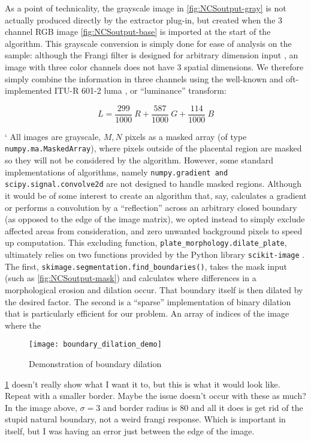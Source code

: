	As a point of technicality, the grayscale image in \cref{fig:NCSoutput-gray} is not actually produced directly by the extractor plug-in, but created when the 3 channel RGB image \cref{fig:NCSoutput-base} is imported at the start of the algorithm. This grayscale conversion is simply done for ease of analysis on the sample: although the Frangi filter is designed for arbitrary dimension input \cite{frangi1998multiscale}, an image with three color channels does not have 3 spatial dimensions. We therefore simply combine the information in three channels using the well-known and oft-implemented ITU-R 601-2 luma \cite{scipy}, or ``luminance'' transform:
	
	\begin{equation} \label{eq:luma_transform}
	L =  \frac{299}{1000}\ R + \frac{587}{1000}\ G + \frac{114}{1000}\ B
	\end{equation}

`	All images are grayscale, $M,N$ pixels as a masked array (of type
	\texttt{numpy.ma.MaskedArray}), where pixels outside of the placental region are masked so they will not be considered by the algorithm. However, some standard
	implementations of algorithms, namely \texttt{numpy.gradient and scipy.signal.convolve2d} are not designed to handle masked regions. Although it would be of some interest to create an algorithm that, say, calculates a gradient or performs a convolution by a ``reflection'' across an arbitrary closed boundary (as opposed to the edge of the image matrix), we opted instead to simply exclude affected areas from consideration, and zero unwanted background pixels to speed up computation. This excluding function,
	\texttt{plate\_morphology.dilate\_plate}, ultimately relies on two functions
	provided by the Python library \texttt{scikit-image} \cite{skimage}. The first, \texttt{skimage.segmentation.find\_boundaries()}, takes the mask input (such as \cref{fig:NCSoutput-mask}) and calculates where differences in a morphological erosion and dilation occur. That boundary itself is then dilated by the desired factor. The second is a ``sparse'' implementation of binary dilation that is particularly efficient for our problem. An array of indices of the image where the 
	
	\begin{figure}  \label{fig:boundary-demo}
		\texttt{[image: boundary\_dilation\_demo]}
		\caption{Demonstration of boundary dilation}
	\end{figure}
	
	\ref{fig:boundary-demo} doesn't really show what I want it to, but this is what it would look like. Repeat with a smaller border. Maybe the issue doesn't occur with these as much? 	In the image above, $\sigma=3$ and border radius is 80 and all it does is get 	rid of the stupid natural boundary, not a weird frangi response. Which is important in itself, but I was having an error just between the edge of the image.
	
